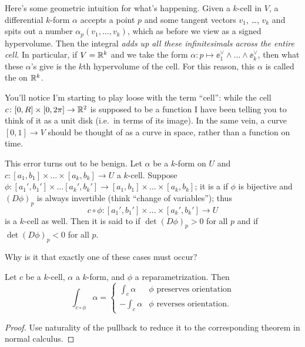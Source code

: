 Here's some geometric intuition for what's happening.
Given a $k$-cell in $V$, a differential $k$-form $\alpha$ accepts a point $p$ and some tangent vectors $v_1$, \dots, $v_k$
and spits out a number $\alpha_p(v_1, \dots, v_k)$,
which as before we view as a signed hypervolume.
Then the integral \emph{adds up all these infinitesimals across the entire cell}.
In particular, if $V = \mathbb R^k$ and we take the form $\alpha \colon p \mapsto \ee_1^\vee \wedge \dots \wedge \ee_k^\vee$,
then what these $\alpha$'s give is the $k$th hypervolume of the cell.
For this reason, this $\alpha$ is called the  on $\mathbb R^k$.

You'll notice I'm starting to play loose with the term ``cell'':
while the cell $c \colon [0,R] \times [0,2\pi] \to \mathbb R^2$ is supposed to be a function
I have been telling you to think of it as a unit disk (i.e.\ in terms of its image).
In the same vein, a curve $[0,1] \to V$ should be thought of as a curve in space,
rather than a function on time.

This error turns out to be benign.
Let $\alpha$ be a $k$-form on $U$ and $c \colon [a_1, b_1] \times \dots \times [a_k, b_k] \to U$ a $k$-cell.
Suppose $\phi \colon [a_1', b_1'] \times \dots [a_k', b_k'] \to [a_1, b_1] \times \dots \times [a_k, b_k]$;
it is a  if $\phi$ is bijective and $(D\phi)_p$ is always invertible
(think ``change of variables'');
thus
\[ c \circ \phi \colon [a_1', b_1'] \times \dots \times [a_k',b_k'] \to U \]
is a $k$-cell as well.
Then it is said to  if $\det(D\phi)_p > 0$ for all $p$
and  if $\det(D\phi)_p < 0$ for all $p$.
\begin{exercise}
	Why is it that exactly one of these cases must occur?
\end{exercise}

\begin{theorem}
	\label{thm:reparam_integral}
	Let $c$ be a $k$-cell, $\alpha$ a $k$-form, and $\phi$ a reparametrization.
	Then
	\[ \int_{c \circ \phi} \alpha
		=
		\begin{cases}
			\int_c \alpha & \phi \text{ preserves orientation} \\
			- \int_c \alpha & \phi \text{ reverses orientation}.
		\end{cases}
	\]
\end{theorem}
\begin{proof}
	Use naturality of the pullback to reduce it to the corresponding
	theorem in normal calculus.
\end{proof}

